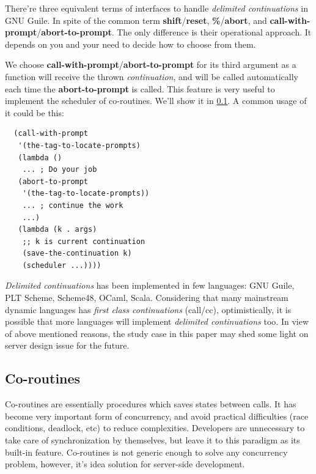 \documentclass[numbers,numberedpars]{sigplanconf}
\begin{document}
There're three equivalent terms of interfaces to handle {\it delimited continuations} in GNU Guile. In spite of the common term {\bf shift}/{\bf reset},
{\bf \%}/{\bf abort}, and {\bf call-with-prompt}/{\bf abort-to-prompt}. The only difference is their operational approach. It depends on you and your
need to decide how to choose from them.

We choose {\bf call-with-prompt}/{\bf abort-to-prompt} for its third argument as a function will receive the thrown {\it continuation}, and will be
called automatically each time the {\bf abort-to-prompt} is called. This feature is very useful to implement the scheduler of co-routines. We'll show it
in \ref{Co-routines}. A common usage of it could be this:

\begin{lstlisting}
  (call-with-prompt
   '(the-tag-to-locate-prompts)
   (lambda ()
    ... ; Do your job
   (abort-to-prompt
    '(the-tag-to-locate-prompts))
    ... ; continue the work
    ...)
   (lambda (k . args)
    ;; k is current continuation
    (save-the-continuation k)
    (scheduler ...))))
\end{lstlisting}

{\it Delimited continuations} has been implemented in few languages: GNU Guile, PLT Scheme, Scheme48, OCaml, Scala.
Considering that many mainstream dynamic languages has {\it first class continuations} (call/cc), optimistically, it is possible that more languages
will implement {\it delimited continuations} too. In view of above mentioned reasons, the study case in this paper may shed some light on server
design issue for the future.

\subsection{Co-routines} \label{Co-routines}

Co-routines are essentially procedures which saves states between calls. It has become very important form of concurrency, and avoid practical
difficulties (race conditions, deadlock, etc) to reduce complexities. Developers are unnecessary to take care of synchronization by
themselves, but leave it to this paradigm as its built-in feature. Co-routines is not generic enough to solve any concurrency problem, however,
it's idea solution for server-side development.
\end{document}
